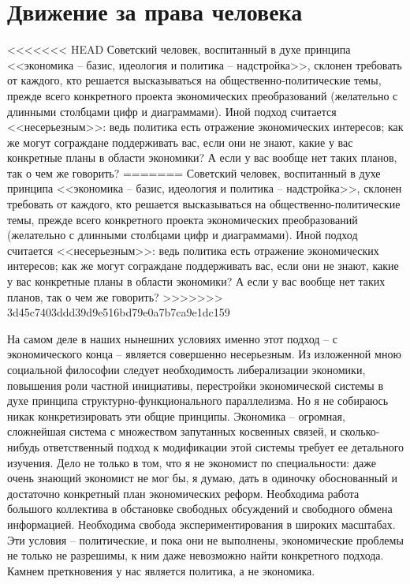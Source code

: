 \documentclass{book}
\begin{document}
\section{Движение за права человека}

<<<<<<< HEAD
Советский человек, воспитанный в духе принципа <<экономика -- базис, идеология и политика -- надстройка>>, склонен требовать от каждого, кто решается высказываться на обще­ственно‑политические темы, прежде всего конкретного проекта экономических преобразований (желательно с длинными столбцами цифр и диаграммами). Иной подход считается <<несерьезным>>: ведь политика есть отражение экономических интересов; как же могут сограждане поддерживать вас, если они не знают, какие у вас конкретные планы в области экономики? А если у вас вообще нет таких планов, так о чем же говорить?
=======
Советский человек, воспитанный в духе принципа <<экономика -- базис, идеология и политика -- надстройка>>, склонен требовать от каждого, кто решается высказываться на обще­ственно-политические темы, прежде всего конкретного проекта экономических преобразований (желательно с длинными столбцами цифр и диаграммами). Иной подход считается <<несерьезным>>: ведь политика есть отражение экономических интересов; как же могут сограждане поддерживать вас, если они не знают, какие у вас конкретные планы в области экономики? А если у вас вообще нет таких планов, так о чем же говорить?
>>>>>>> 3d45c7403ddd39d9e516bd79e0a7b7ca9e1dc159

На самом деле в наших нынешних условиях именно этот подход -- с экономического конца -- является совершенно несерьезным. Из изложенной мною социальной философии следует необходимость либерализации экономики, повышения роли частной инициативы, перестройки экономической системы в духе принципа структурно-функционального параллелизма. Но я не собираюсь никак конкретизировать эти общие принципы. Экономика -- огромная, сложнейшая система с мно­жеством запутанных косвенных связей, и сколько-нибудь ответственный подход к модификации этой системы требует ее детального изучения. Дело не только в том, что я не экономист по специальности: даже очень знающий экономист не мог бы, я думаю, дать в одиночку обоснованный и достаточно конкретный план экономических реформ. Необходима работа большого коллектива в обстановке свободных обсуждений и свободного обмена информацией. Необходима свобода экспериментирования в широких масштабах. Эти условия -- политические, и пока они не выполнены, экономические проблемы не только не 
разрешимы, к ним даже невозможно найти конкретного подхода. Камнем преткновения у нас является политика, а не экономика.
\end{document}
